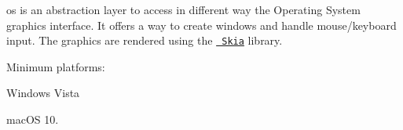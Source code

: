 {\ttfamily os} is an abstraction layer to access in different way the Operating System graphics interface. It offers a way to create windows and handle mouse/keyboard input. The graphics are rendered using the \href{https://skia.org/}{\texttt{ Skia}} library.

Minimum platforms\+:


\begin{DoxyItemize}
\item Windows Vista
\item mac\+OS 10. 
\end{DoxyItemize}